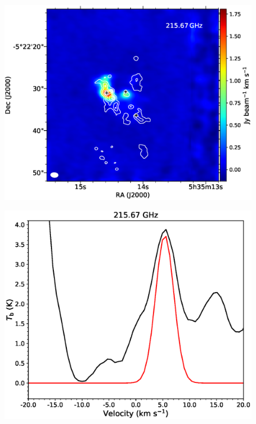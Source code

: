 \begin{figure}[htp] 
\begin{center}
\begin{minipage}{0.98\textwidth} 
\begin{center}
\begin{minipage}{0.48\textwidth}
\begin{center}
\includegraphics[width=0.98\textwidth]{OrionKL/mom0/215.67mom0_3-7.eps}
\label{fig:215mom}
\end{center}
\end{minipage}
\begin{minipage}{0.48\textwidth}
\begin{center}
\includegraphics[width=0.98\textwidth]{OrionKL/spectrum/HC/215.6696452w_fit.eps}

\end{center}
\end{minipage}
\end{center}
\end{minipage}
\end{center}
\end{figure}
